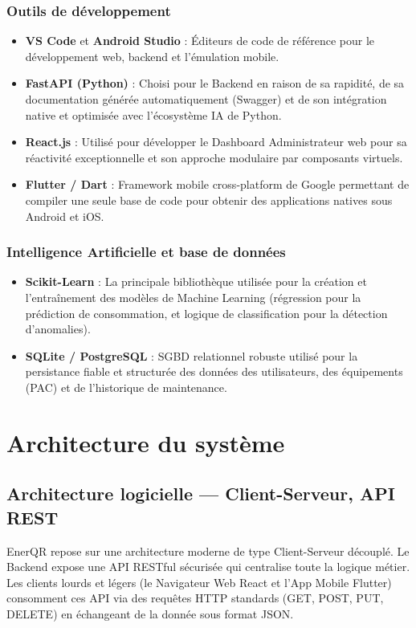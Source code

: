 \documentclass[12pt,a4paper]{report}
\begin{document}
\subsubsection{Outils de développement}
\begin{itemize}
    \item \textbf{VS Code} et \textbf{Android Studio} : Éditeurs de code de référence pour le développement web, backend et l'émulation mobile.
    \item \textbf{FastAPI (Python)} : Choisi pour le Backend en raison de sa rapidité, de sa documentation générée automatiquement (Swagger) et de son intégration native et optimisée avec l'écosystème IA de Python.
    \item \textbf{React.js} : Utilisé pour développer le Dashboard Administrateur web pour sa réactivité exceptionnelle et son approche modulaire par composants virtuels.
    \item \textbf{Flutter / Dart} : Framework mobile cross-platform de Google permettant de compiler une seule base de code pour obtenir des applications natives sous Android et iOS.
\end{itemize}

\subsubsection{Intelligence Artificielle et base de données}
\begin{itemize}
    \item \textbf{Scikit-Learn} : La principale bibliothèque utilisée pour la création et l'entraînement des modèles de Machine Learning (régression pour la prédiction de consommation, et logique de classification pour la détection d'anomalies).
    \item \textbf{SQLite / PostgreSQL} : SGBD relationnel robuste utilisé pour la persistance fiable et structurée des données des utilisateurs, des équipements (PAC) et de l'historique de maintenance.
\end{itemize}

\section{Architecture du système}
\subsection{Architecture logicielle — Client-Serveur, API REST}
EnerQR repose sur une architecture moderne de type Client-Serveur découplé. Le Backend expose une API RESTful sécurisée qui centralise toute la logique métier. Les clients lourds et légers (le Navigateur Web React et l'App Mobile Flutter) consomment ces API via des requêtes HTTP standards (GET, POST, PUT, DELETE) en échangeant de la donnée sous format JSON.
\end{document}
